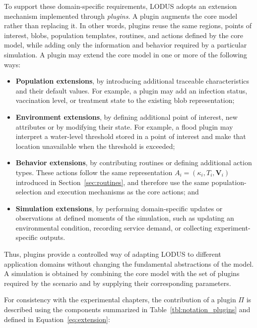 To support these domain-specific requirements, LODUS adopts an extension mechanism implemented through \emph{plugins}. A plugin augments the core model rather than replacing it. In other words, plugins reuse the same regions, points of interest, blobs, population templates, routines, and actions defined by the core model, while adding only the information and behavior required by a particular simulation. A plugin may extend the core model in one or more of the following ways:

\begin{itemize}
    \item \textbf{Population extensions}, by introducing additional traceable characteristics and their default values. For example, a plugin may add an infection status, vaccination level, or treatment state to the existing blob representation;

    \item \textbf{Environment extensions}, by defining additional point of interest, new attributes or by modifying their state. For example, a flood plugin may interpret a water-level threshold stored in a point of interest and make that location unavailable when the threshold is exceeded;

    \item \textbf{Behavior extensions}, by contributing routines or defining additional action types. These actions follow the same representation $A_i=(\kappa_i,T_i,\bm{V}_i)$ introduced in Section~\ref{sec:routines}, and therefore use the same population-selection and execution mechanisms as the core actions; and

    \item \textbf{Simulation extensions}, by performing domain-specific updates or observations at defined moments of the simulation, such as updating an environmental condition, recording service demand, or collecting experiment-specific outputs.
\end{itemize}

Thus, plugins provide a controlled way of adapting LODUS to different application domains without changing the fundamental abstractions of the model. A simulation is obtained by combining the core model with the set of plugins required by the scenario and by supplying their corresponding parameters.

For consistency with the experimental chapters, the contribution of a plugin $\Pi$ is described using the components summarized in Table~\ref{tbl:notation_plugins} and defined in Equation~\ref{eq:extension}:

